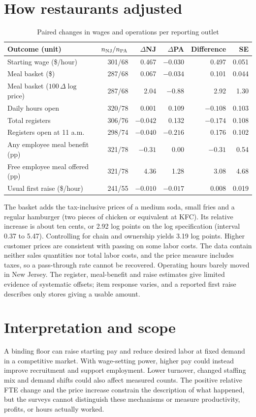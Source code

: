 \documentclass[11pt]{article}
\begin{document}
\section{How restaurants adjusted}
\begin{table}[h!]
\centering
\caption{Paired changes in wages and operations per reporting outlet}
\label{tab:ops}
\small
\begin{tabular}{lrrrrr}
\toprule
Outcome (unit) & $n_{\rm NJ}/n_{\rm PA}$ & $\Delta$NJ & $\Delta$PA & Difference & SE\\
\midrule
Starting wage (\$/hour) &301/68&0.467&$-0.030$&0.497&0.051\\
Meal basket (\$) &287/68&0.067&$-0.034$&0.101&0.044\\
Meal basket ($100\,\Delta\log$ price) &287/68&2.04&$-0.88$&2.92&1.30\\
Daily hours open &320/78&0.001&0.109&$-0.108$&0.103\\
Total registers &306/76&$-0.042$&0.132&$-0.174$&0.108\\
Registers open at 11 a.m. &298/74&$-0.040$&$-0.216$&0.176&0.102\\
Any employee meal benefit (pp) &321/78&$-0.31$&0.00&$-0.31$&0.54\\
Free employee meal offered (pp) &321/78&4.36&1.28&3.08&4.68\\
Usual first raise (\$/hour) &241/55&$-0.010$&$-0.017$&0.008&0.019\\
\bottomrule
\end{tabular}
\end{table}

The basket adds the tax-inclusive prices of a medium soda, small fries and a regular hamburger (two pieces of chicken or equivalent at KFC). Its relative increase is about ten cents, or 2.92 log points on the log specification (interval 0.37 to 5.47). Controlling for chain and ownership yields 3.19 log points. Higher customer prices are consistent with passing on some labor costs. The data contain neither sales quantities nor total labor costs, and the price measure includes taxes, so a pass-through rate cannot be recovered. Operating hours barely moved in New Jersey. The register, meal-benefit and raise estimates give limited evidence of systematic offsets; item response varies, and a reported first raise describes only stores giving a usable amount.

\section{Interpretation and scope}
A binding floor can raise starting pay and reduce desired labor at fixed demand in a competitive market. With wage-setting power, higher pay could instead improve recruitment and support employment. Lower turnover, changed staffing mix and demand shifts could also affect measured counts. The positive relative FTE change and the price increase constrain the description of what happened, but the surveys cannot distinguish these mechanisms or measure productivity, profits, or hours actually worked.
\end{document}
